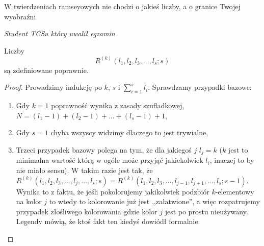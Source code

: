 \label{ramsey}
 \epigraph{W twierdzeniach ramseyowych nie chodzi o jakieś liczby, a o granice Twojej wyobraźni}{\textit{Student TCSu który uwalił egzamin}}
    \begin{theorem}
            Liczby
    \begin{equation*}
         R^{(k)}(l_1,l_2,l_3,\dots,l_s;s)
    \end{equation*}
    są zdefiniowane poprawnie. 
    \end{theorem}

    \begin{proof}
        Prowadzimy indukcję po $k$, $s$ i $\sum_{i=1}^{s} l_i$. Sprawdzamy przypadki bazowe:
        \begin{enumerate}
            \item Gdy $k = 1$ poprawność wynika z zasady szufladkowej, $N = (l_1 - 1) + (l_2 - 1) + \dots + (l_s - 1) + 1$,
            \item Gdy $s = 1$ chyba wszyscy widzimy dlaczego to jest trywialne,
            \item Trzeci przypadek bazowy polega na tym, że dla jakiegoś $j$ $l_j = k$ ($k$ jest to minimalna wartość którą w ogóle może przyjąć jakiekolwiek $l_i$, inaczej to by nie miało sensu). W takim razie jest tak, że $R^{(k)}(l_1,l_2,l_3,\dots,l_j,\dots,l_s;s) = R^{(k)}(l_1,l_2,l_3,\dots,l_{j-1}, l_{j+1}, \dots,l_s;s-1)$. Wynika to z faktu, że jeśli pokolorujemy jakikolwiek podzbiór $k$-elementowy na kolor $j$ to wtedy to kolorowanie już jest ,,załatwione'', a więc rozpatrujemy przypadek złośliwego kolorowania gdzie kolor $j$ jest po prostu nieużywany. Legendy mówią, że ktoś fakt ten kiedyś dowiódł formalnie.
        \end{enumerate}


\end{proof}
